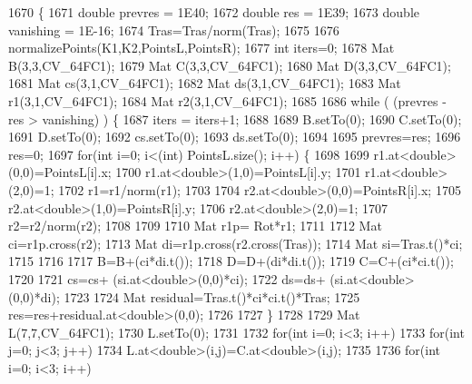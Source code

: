 \begin{DoxyCode}
1670                                                                                                            
              \{
1671     \textcolor{keywordtype}{double} prevres = 1E40;
1672     \textcolor{keywordtype}{double} res = 1E39;
1673     \textcolor{keywordtype}{double} vanishing = 1E-16;
1674     Tras=Tras/norm(Tras);
1675 
1676     normalizePoints(K1,K2,PointsL,PointsR);
1677     \textcolor{keywordtype}{int} iters=0;
1678     Mat B(3,3,CV\_64FC1);
1679     Mat C(3,3,CV\_64FC1);
1680     Mat D(3,3,CV\_64FC1);
1681     Mat cs(3,1,CV\_64FC1);
1682     Mat ds(3,1,CV\_64FC1);
1683     Mat r1(3,1,CV\_64FC1);
1684     Mat r2(3,1,CV\_64FC1);
1685 
1686     \textcolor{keywordflow}{while} ( (prevres  - res  >  vanishing) ) \{
1687         iters = iters+1;
1688 
1689         B.setTo(0);
1690         C.setTo(0);
1691         D.setTo(0);
1692         cs.setTo(0);
1693         ds.setTo(0);
1694 
1695         prevres=res;
1696         res=0;
1697         \textcolor{keywordflow}{for}(\textcolor{keywordtype}{int} i=0; i<(int) PointsL.size(); i++) \{
1698 
1699             r1.at<\textcolor{keywordtype}{double}>(0,0)=PointsL[i].x;
1700             r1.at<\textcolor{keywordtype}{double}>(1,0)=PointsL[i].y;
1701             r1.at<\textcolor{keywordtype}{double}>(2,0)=1;
1702             r1=r1/norm(r1);
1703 
1704             r2.at<\textcolor{keywordtype}{double}>(0,0)=PointsR[i].x;
1705             r2.at<\textcolor{keywordtype}{double}>(1,0)=PointsR[i].y;
1706             r2.at<\textcolor{keywordtype}{double}>(2,0)=1;
1707             r2=r2/norm(r2);
1708 
1709 
1710             Mat r1p= Rot*r1;
1711 
1712             Mat ci=r1p.cross(r2);
1713             Mat di=r1p.cross(r2.cross(Tras));
1714             Mat si=Tras.t()*ci;
1715 
1716 
1717             B=B+(ci*di.t());
1718             D=D+(di*di.t());
1719             C=C+(ci*ci.t());
1720 
1721             cs=cs+ (si.at<\textcolor{keywordtype}{double}>(0,0)*ci);
1722             ds=ds+ (si.at<\textcolor{keywordtype}{double}>(0,0)*di);
1723 
1724             Mat residual=Tras.t()*ci*ci.t()*Tras;
1725             res=res+residual.at<\textcolor{keywordtype}{double}>(0,0);
1726 
1727         \}
1728 
1729         Mat L(7,7,CV\_64FC1);
1730         L.setTo(0);
1731 
1732         \textcolor{keywordflow}{for}(\textcolor{keywordtype}{int} i=0; i<3; i++)
1733             \textcolor{keywordflow}{for}(\textcolor{keywordtype}{int} j=0; j<3; j++)
1734                 L.at<\textcolor{keywordtype}{double}>(i,j)=C.at<\textcolor{keywordtype}{double}>(i,j);
1735 
1736         \textcolor{keywordflow}{for}(\textcolor{keywordtype}{int} i=0; i<3; i++)

\end{DoxyCode}
